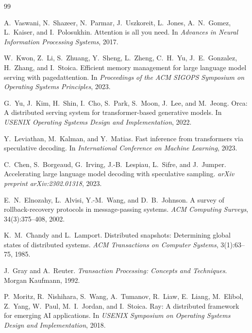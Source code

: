 \documentclass[10pt,twocolumn]{article}
\begin{document}


\begin{thebibliography}{99}

A.~Vaswani, N.~Shazeer, N.~Parmar, J.~Uszkoreit, L.~Jones, A.~N.~Gomez,
L.~Kaiser, and I.~Polosukhin.
\newblock Attention is all you need.
\newblock In \textit{Advances in Neural Information Processing Systems}, 2017.

W.~Kwon, Z.~Li, S.~Zhuang, Y.~Sheng, L.~Zheng, C.~H.~Yu, J.~E.~Gonzalez,
H.~Zhang, and I.~Stoica.
\newblock Efficient memory management for large language model serving with
pagedattention.
\newblock In \textit{Proceedings of the ACM SIGOPS Symposium on Operating
Systems Principles}, 2023.

G.~Yu, J.~Kim, H.~Shin, I.~Cho, S.~Park, S.~Moon, J.~Lee, and M.~Jeong.
\newblock Orca: A distributed serving system for transformer-based generative
models.
\newblock In \textit{USENIX Operating Systems Design and Implementation}, 2022.

Y.~Leviathan, M.~Kalman, and Y.~Matias.
\newblock Fast inference from transformers via speculative decoding.
\newblock In \textit{International Conference on Machine Learning}, 2023.

C.~Chen, S.~Borgeaud, G.~Irving, J.-B.~Lespiau, L.~Sifre, and J.~Jumper.
\newblock Accelerating large language model decoding with speculative sampling.
\newblock \textit{arXiv preprint arXiv:2302.01318}, 2023.

E.~N.~Elnozahy, L.~Alvisi, Y.-M.~Wang, and D.~B.~Johnson.
\newblock A survey of rollback-recovery protocols in message-passing systems.
\newblock \textit{ACM Computing Surveys}, 34(3):375--408, 2002.

K.~M.~Chandy and L.~Lamport.
\newblock Distributed snapshots: Determining global states of distributed
systems.
\newblock \textit{ACM Transactions on Computer Systems}, 3(1):63--75, 1985.

J.~Gray and A.~Reuter.
\newblock \textit{Transaction Processing: Concepts and Techniques}.
\newblock Morgan Kaufmann, 1992.

P.~Moritz, R.~Nishihara, S.~Wang, A.~Tumanov, R.~Liaw, E.~Liang,
M.~Elibol, Z.~Yang, W.~Paul, M.~I.~Jordan, and I.~Stoica.
\newblock Ray: A distributed framework for emerging {AI} applications.
\newblock In \textit{USENIX Symposium on Operating Systems Design and
Implementation}, 2018.


\end{thebibliography}
\end{document}
